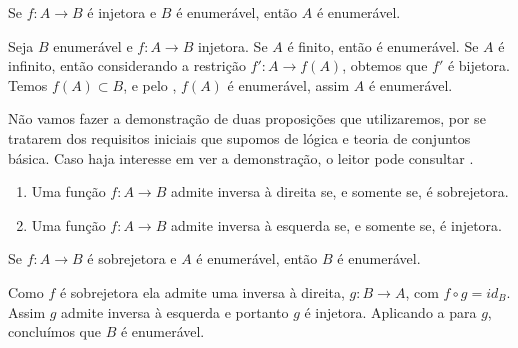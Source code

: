 \documentclass[../main.tex]{subfiles}
\begin{document}
    

\begin{prop}\label{enum-prop-AFInjetoraBEnumeravelAenumeravel}
    Se $f \colon A \to B$ é injetora e $B$ é enumerável, então $A$ é enumerável.
\end{prop}
\begin{dem}
    Seja $B$ enumerável e $f \colon A \to B$ injetora.
    Se $A$ é finito, então é enumerável. Se $A$ é infinito, então considerando a restrição $f' \colon A \to f(A)$, obtemos que $f'$ é bijetora.
    Temos $f(A) \subset B$, e pelo , $f(A)$ é enumerável, assim $A$ é enumerável.
\end{dem}

\begin{obs}
    Não vamos fazer a demonstração de duas proposições que utilizaremos, por se tratarem dos requisitos iniciais que supomos de lógica e teoria de conjuntos básica. Caso haja interesse em ver a demonstração, o leitor pode consultar \textcite[p. 22]{lima-analise-1}.
    \begin{enumerate}[label=(\roman*)]
        \item Uma função $f \colon A \to B$ admite inversa à direita se, e somente se, é sobrejetora.
        \item Uma função $f \colon A \to B$ admite inversa à esquerda se, e somente se, é injetora.
    \end{enumerate}
\end{obs}

\begin{prop}\label{enum-prop-sobrejecaoABBEnumeravelAEnumeravel}
    Se $f \colon A \to B$ é sobrejetora e $A$ é enumerável, então $B$ é enumerável.
\end{prop}
\begin{dem}
    Como $f$ é sobrejetora ela admite uma inversa à direita, $g \colon B \to A$, com $f \circ g = id_B$. Assim $g$ admite inversa à esquerda e portanto $g$ é injetora. Aplicando a  para $g$, concluímos que $B$ é enumerável. 
\end{dem}

\end{document}
